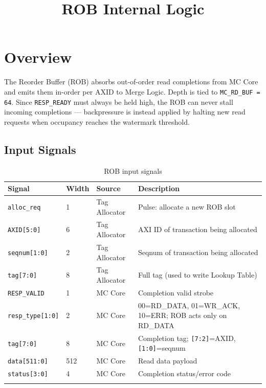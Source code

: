 \documentclass[11pt]{article}
\title{\textbf{ROB Internal Logic}}
\date{}
\author{}
\begin{document}
\maketitle
\thispagestyle{empty}

\section{Overview}

The Reorder Buffer (ROB) absorbs out-of-order read completions from MC Core and emits them in-order per AXID to Merge Logic. Depth is tied to \texttt{MC\_RD\_BUF = 64}. Since \texttt{RESP\_READY} must always be held high, the ROB can never stall incoming completions — backpressure is instead applied by halting new read requests when occupancy reaches the watermark threshold.

\subsection*{Input Signals}
\begin{longtable}{llll}
\toprule
\textbf{Signal} & \textbf{Width} & \textbf{Source} & \textbf{Description} \\
\midrule
\texttt{alloc\_req}     & 1   & Tag Allocator & Pulse: allocate a new ROB slot \\
\texttt{AXID[5:0]}      & 6   & Tag Allocator & AXI ID of transaction being allocated \\
\texttt{seqnum[1:0]}    & 2   & Tag Allocator & Seqnum of transaction being allocated \\
\texttt{tag[7:0]}       & 8   & Tag Allocator & Full tag (used to write Lookup Table) \\
\texttt{RESP\_VALID}    & 1   & MC Core       & Completion valid strobe \\
\texttt{resp\_type[1:0]}& 2   & MC Core       & 00=RD\_DATA, 01=WR\_ACK, 10=ERR; ROB acts only on RD\_DATA \\
\texttt{tag[7:0]}       & 8   & MC Core       & Completion tag; \texttt{[7:2]}=AXID, \texttt{[1:0]}=seqnum \\
\texttt{data[511:0]}    & 512 & MC Core       & Read data payload \\
\texttt{status[3:0]}    & 4   & MC Core       & Completion status/error code \\
\bottomrule
\caption{ROB input signals}
\end{longtable}
\end{document}
